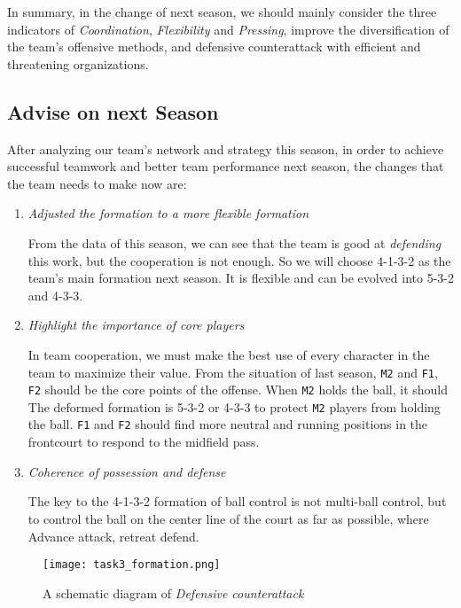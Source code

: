 \documentclass[12pt]{article}  %
\begin{document}
In summary, in the change of next season, we should mainly consider the three indicators of \textit{Coordination}, \textit{Flexibility} and \textit{Pressing}, improve the diversification of the team's offensive methods, and defensive counterattack with efficient and threatening organizations.

\subsection{Advise on next Season}
After analyzing our team's network and strategy this season, in order to achieve successful teamwork and better team performance next season, the changes that the team needs to make now are:
\begin{enumerate}
    \item \textit{Adjusted the formation to a more flexible formation}
    
    From the data of this season, we can see that the team is good at \textit{defending} this work, but the cooperation is not enough. So we will choose \textsf{4-1-3-2} as the team's main formation next season. It is flexible and can be evolved into \textsf{5-3-2} and \textsf{4-3-3}.
    \item \textit{Highlight the importance of core players}
    
    In team cooperation, we must make the best use of every character in the team to maximize their value. From the situation of last season, \texttt{M2} and \texttt{F1}, \texttt{F2} should be the core points of the offense. When \texttt{M2} holds the ball, it should The deformed formation is \textsf{5-3-2} or \textsf{4-3-3} to protect \texttt{M2} players from holding the ball. \texttt{F1} and \texttt{F2} should find more neutral and running positions in the frontcourt to respond to the midfield pass.
    \item \textit{Coherence of possession and defense}
    
    The key to the \textsf{4-1-3-2} formation of ball control is not multi-ball control, but to control the ball on the center line of the court as far as possible, where Advance attack, retreat defend.
\end{enumerate}

\begin{figure}[htbp]
    \centering
    \texttt{[image: task3\_formation.png]} 	%
    \caption{A schematic diagram of \textit{Defensive counterattack}}		%
    \label{fig:task3_formation}							%
\end{figure}
\end{document}
